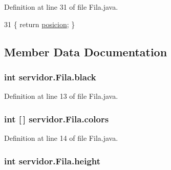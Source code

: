 Definition at line 31 of file Fila.\+java.


\begin{DoxyCode}
31 \{ \textcolor{keywordflow}{return} \hyperlink{classservidor_1_1Fila_a57f83b01118720d2e7e4abae6e79444c}{posicion}; \}
\end{DoxyCode}


\subsection{Member Data Documentation}
\subsubsection[{\texorpdfstring{black}{black}}]{\setlength{\rightskip}{0pt plus 5cm}int servidor.\+Fila.\+black\hspace{0.3cm}{\ttfamily [private]}}\hypertarget{classservidor_1_1Fila_a5be0f71164db61e012c9c5b464e698ca}{}\label{classservidor_1_1Fila_a5be0f71164db61e012c9c5b464e698ca}


Definition at line 13 of file Fila.\+java.

\subsubsection[{\texorpdfstring{colors}{colors}}]{\setlength{\rightskip}{0pt plus 5cm}int \mbox{[}$\,$\mbox{]} servidor.\+Fila.\+colors\hspace{0.3cm}{\ttfamily [private]}}\hypertarget{classservidor_1_1Fila_a7f175c78fb6e553bd01d06054c46e086}{}\label{classservidor_1_1Fila_a7f175c78fb6e553bd01d06054c46e086}


Definition at line 14 of file Fila.\+java.

\subsubsection[{\texorpdfstring{height}{height}}]{\setlength{\rightskip}{0pt plus 5cm}int servidor.\+Fila.\+height\hspace{0.3cm}{\ttfamily [package]}}\hypertarget{classservidor_1_1Fila_aab3edb5ec7dc0d0df4d4bf89a49aa72f}{}\label{classservidor_1_1Fila_aab3edb5ec7dc0d0df4d4bf89a49aa72f}


